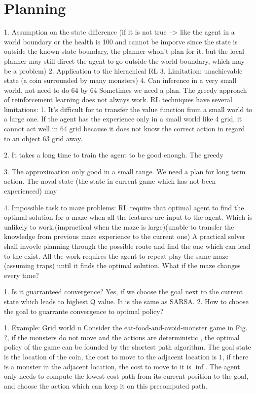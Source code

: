 \chapter{Planning}
1. Assumption on the state difference (if it is not true --> like the agent in a world boundary or the health is 100 and cannot be imporve
  since the state is outside the known state boundary, the planner whon't plan for it. but the local planner may still direct the agent
  to go outside the world boundary, which may be a problem)
2. Application to the hierachical RL
3. Limitation: unachievable state (a coin surrounded by many monsters)
4. Can inference in a very small world, not need to do 64 by 64
Sometimes we need a plan. The greedy approach of reinforcement learning does not always work. 
RL techniques have several limitations:
1. It's difficult for to transfer the value function from a small world to a large one. If the agent has
the experience only in a small world like 4  grid, it cannot act well in 64  grid
because it does not know the correct action in regard to an object 63 grid away.

2. It takes a long time to train the agent to be good enough. The greedy 

3. The approximation only good in a small range. We need a plan for long term action.
The noval state (the state in current game which has not been experienced) may 

4. Impossible task to maze problems: RL require that optimal agent to find the optimal solution for a maze when all the features
are input to the agent. Which is unlikely to work.(impractical when the maze is large)(unable to transfer
the knowledge from previous maze experience to the current one) A practical solver shall invovle planning through 
the possible route and find the one which can lead to the exist.
All the work requires the agent to repeat play the same maze (assuming traps) until it finds the optimal solution.
What if the maze changes every time?

1. Is it guarranteed convergence? Yes, if we choose the goal next to the current state which leads to highest Q value. 
It is the same as SARSA.
2. How to choose the goal to guarrante convergence to optimal policy?


1. Example: Grid world u
Consider the eat-food-and-avoid-monster game in Fig. ?, if the monsters do not move and the actions are deterministic
, the optimal policy of the game can be founded by the shortest path algorithm. The goal state is the location of the coin,
the cost to move to the adjacent location is $1$, if there is a monster in the adjacent location, the cost 
to move to it is $\inf$. The agent only needs to compute the lowest cost path from its current position to the goal,
and choose the action which can keep it on this precomputed path.

